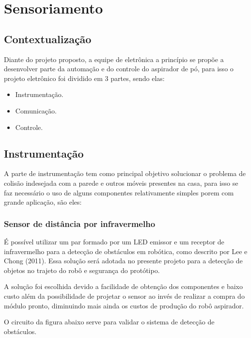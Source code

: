 \section{Sensoriamento} %
\subsection{Contextualização}
\label{sub:contextualização}
Diante do projeto proposto, a equipe de eletrônica a princípio se propõe a desenvolver parte da automação e do controle do aspirador de pó, para isso o projeto eletrônico foi dividido em 3 partes, sendo elas:
  \begin{itemize}
    \item Instrumentação.
    \item Comunicação.
    \item Controle.
  \end{itemize}

\subsection{Instrumentação} %
\label{sub:instrumentação}


A parte de instrumentação tem como principal objetivo solucionar o problema de colisão indesejada com a parede e outros móveis presentes na casa, para isso se faz necessário o uso de alguns componentes relativamente simples porem com grande aplicação, são eles:
 
  \subsubsection{Sensor de distância por infravermelho} 
  \label{sub:Sensor_de_distância_por_infravermelho}
    É possível utilizar um par formado por um LED emissor e um receptor de infravermelho para a detecção de obstáculos em robótica, como descrito por Lee e Chong (2011).  Essa solução será adotada no presente projeto para a detecção de objetos no trajeto do robô e segurança do protótipo.\cite{detectar_objeto}

    A solução foi escolhida devido a facilidade de obtenção dos componentes e baixo custo além da possibilidade de projetar o sensor ao invés de realizar a compra do módulo pronto, diminuindo mais ainda os custos de produção do robô aspirador.

    O circuito da figura abaixo serve para validar o sistema de detecção de obstáculos.

